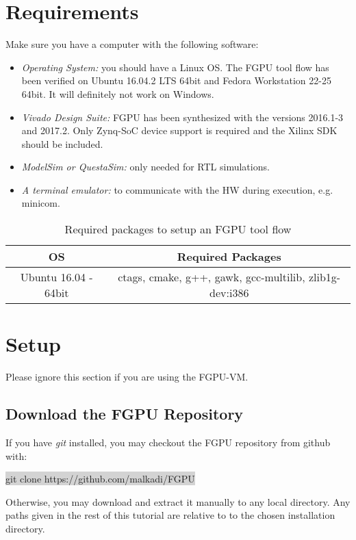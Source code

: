 \documentclass[11pt]{article}
\begin{document}
\section{Requirements}
Make sure you have a computer with the following software:
\begin{itemize}
  \item \emph{Operating System:} you should have a Linux OS.
    The FGPU tool flow has been verified on Ubuntu 16.04.2 LTS 64bit and Fedora Workstation 22-25 64bit.
    It will definitely not work on Windows.
  \item \emph{Vivado Design Suite:} FGPU has been synthesized with the versions 2016.1-3 and 2017.2.
    Only Zynq-SoC device support is required and the Xilinx SDK should be included.
  \item \emph{ModelSim or QuestaSim:}
    only needed for RTL simulations.
  \item \emph{A terminal emulator:} to communicate with the HW during execution, e.g. minicom.
\end{itemize}

\begin{table}[t]
  \centering
  \caption{Required packages to setup an FGPU tool flow}
  \label{tab:packages}
  \begin{tabular}{c|c}
    OS    & Required Packages \\ \hline
    Ubuntu 16.04 - 64bit & ctags, cmake, g++, gawk, gcc-multilib, zlib1g-dev:i386\\ \hline
  \end{tabular}
  
\end{table}

\section{Setup}
Please ignore this section if you are using the FGPU-VM.

\subsection{Download the FGPU Repository}
If you have \emph{git} installed, you may checkout the FGPU repository from github with:

\centering \colorbox{lightGray}{ git clone https://github.com/malkadi/FGPU}

\raggedright
Otherwise, you may download and extract it manually to any local directory.
Any paths given in the rest of this tutorial are relative to to the chosen installation directory.
\end{document}

